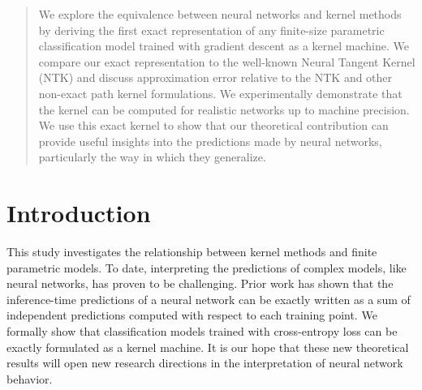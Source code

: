 






\begin{abstract}
We explore the equivalence between neural networks and kernel methods by deriving the first exact representation of any finite-size parametric classification model trained with gradient descent as a kernel machine. We compare our exact representation to the well-known Neural Tangent Kernel (NTK) and discuss approximation error relative to the NTK and other non-exact path kernel formulations. We experimentally demonstrate that the kernel can be computed for realistic networks up to machine precision. We use this exact kernel to show that our theoretical contribution can provide useful insights into the predictions made by neural networks, particularly the way in which they generalize.
\end{abstract}

\section{Introduction}

This study investigates the relationship between kernel methods and finite parametric models. To date, interpreting the predictions of complex models, like neural networks, has proven to be challenging. Prior work has shown that the inference-time predictions of a neural network can be exactly written as a sum of independent predictions computed with respect to each training point. We formally show that classification models trained with cross-entropy loss can be exactly formulated as a kernel machine. It is our hope that these new theoretical results will open new research directions in the interpretation of neural network behavior.




